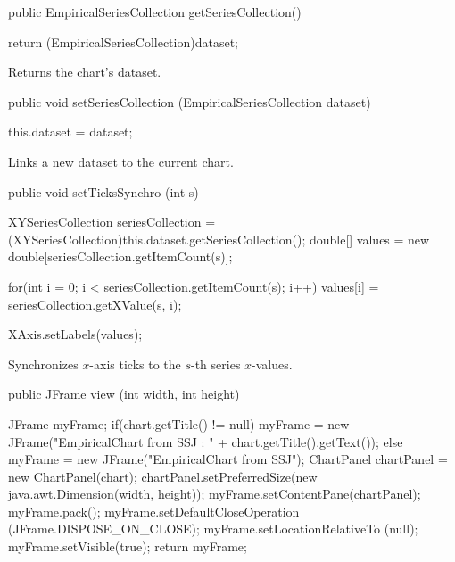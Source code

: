 \begin{code}

   public EmpiricalSeriesCollection getSeriesCollection() \begin{hide} {
      return (EmpiricalSeriesCollection)dataset;
   }\end{hide}
\end{code}
\begin{tabb}
   Returns the chart's dataset.
\end{tabb}
\begin{htmlonly}
\end{htmlonly}
\begin{code}

   public void setSeriesCollection (EmpiricalSeriesCollection dataset) \begin{hide} {
      this.dataset = dataset;
   }\end{hide}
\end{code}
\begin{tabb}
   Links a new dataset to the current chart.
\end{tabb}
\begin{htmlonly}
\end{htmlonly}
\begin{code}

   public void setTicksSynchro (int s) \begin{hide} {
      XYSeriesCollection seriesCollection = (XYSeriesCollection)this.dataset.getSeriesCollection();
      double[] values = new double[seriesCollection.getItemCount(s)];

      for(int i = 0; i < seriesCollection.getItemCount(s); i++)
         values[i] = seriesCollection.getXValue(s, i);

      XAxis.setLabels(values);
   }\end{hide}
\end{code}
\begin{tabb}
   Synchronizes $x$-axis ticks to the $s$-th series $x$-values.
\end{tabb}
\begin{htmlonly}
\end{htmlonly}
\begin{code}

   public JFrame view (int width, int height) \begin{hide} {
      JFrame myFrame;
      if(chart.getTitle() != null)
         myFrame = new JFrame("EmpiricalChart from SSJ : " + chart.getTitle().getText());
      else
         myFrame = new JFrame("EmpiricalChart from SSJ");
      ChartPanel chartPanel = new ChartPanel(chart);
      chartPanel.setPreferredSize(new java.awt.Dimension(width, height));
      myFrame.setContentPane(chartPanel);
      myFrame.pack();
      myFrame.setDefaultCloseOperation (JFrame.DISPOSE_ON_CLOSE);
      myFrame.setLocationRelativeTo (null);
      myFrame.setVisible(true);
      return myFrame;
   }\end{hide}
\end{code}
